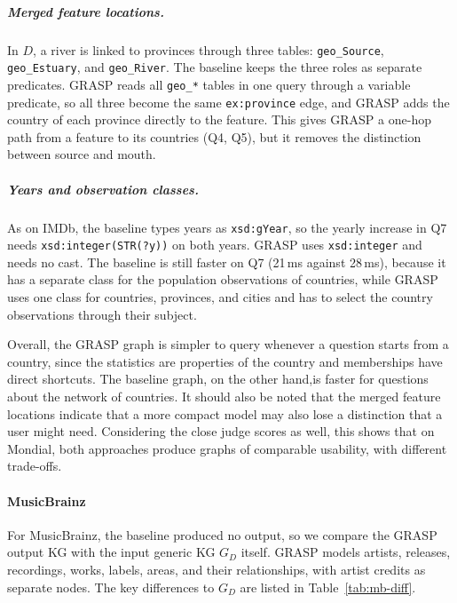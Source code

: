 \subparagraph{Merged feature locations.}
In \(D\), a river is linked to provinces through three tables: \texttt{geo\_Source}, \texttt{geo\_Estuary}, and \texttt{geo\_River}. The baseline keeps the three roles as separate predicates. GRASP reads all \texttt{geo\_*} tables in one query through a variable predicate, so all three become the same \texttt{ex:province} edge, and GRASP adds the country of each province directly to the feature. This gives GRASP a one-hop path from a feature to its countries (Q4, Q5), but it removes the distinction between source and mouth. 

\subparagraph{Years and observation classes.}
As on IMDb, the baseline types years as \texttt{xsd:gYear}, so the yearly increase in Q7 needs \texttt{xsd:integer(STR(?y))} on both years. GRASP uses \texttt{xsd:integer} and needs no cast. The baseline is still faster on Q7 (21\,ms against 28\,ms), because it has a separate class for the population observations of countries, while GRASP uses one class for countries, provinces, and cities and has to select the country observations through their subject.


Overall, the GRASP graph is simpler to query whenever a question starts from a country, since the statistics are properties of the country and memberships have direct shortcuts. The baseline graph, on the other hand,is faster for questions about the network of countries. It should also be noted that the merged feature locations indicate that a more compact model may also lose a distinction that a user might need. Considering the close judge scores as well, this shows that on Mondial, both approaches produce graphs of comparable usability, with different trade-offs.

\paragraph{MusicBrainz}\label{sec:results-musicbrainz}
For MusicBrainz, the baseline produced no output, so we compare the GRASP output KG with the input generic KG \(G_D\) itself. GRASP models artists, releases, recordings, works, labels, areas, and their relationships, with artist credits as separate nodes. The key differences to \(G_D\) are listed in Table~\ref{tab:mb-diff}.

